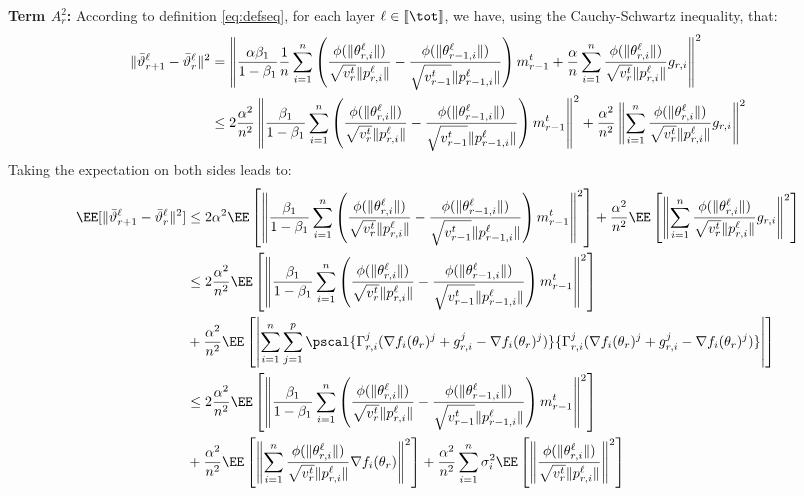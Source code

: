 \documentclass[11pt]{article}
\begin{document}
\textbf{ Term $A_r^2$:}
According to definition \eqref{eq:defseq}, for each layer $\ell \in \llbracket \tot \rrbracket$, we have, using the Cauchy-Schwartz inequality, that:
\begin{align}\notag
  \| \bar{\vartheta}^\ell_{r+1} - \bar{\vartheta}^\ell_r \|^2 & = \left\| \frac{\alpha \beta_1}{1-\beta_1} \frac{1}{n}  \sum_{i = 1}^n  \left( \frac{\phi(\|\theta_{r,i}^{\ell}\|)}{\sqrt{v^{t}_{r}} \|p_{r,i}^{\ell}\|} - \frac{\phi(\|\theta_{r-1,i}^{\ell}\|)}{\sqrt{v^{t}_{r-1}} \|p_{r-1,i}^{\ell}\|} \right) m^{t}_{r-1} + \frac{\alpha}{n} \sum_{i = 1}^n \frac{\phi(\|\theta_{r,i}^{\ell}\|)}{\sqrt{v^{t}_{r}} \|p_{r,i}^{\ell}\|} g_{r,i}\right \|^2 \\\notag
&  \leq 2\frac{\alpha^2}{n^2} \left\| \frac{ \beta_1}{1-\beta_1}   \sum_{i = 1}^n  \left( \frac{\phi(\|\theta_{r,i}^{\ell}\|)}{\sqrt{v^{t}_{r}} \|p_{r,i}^{\ell}\|} - \frac{\phi(\|\theta_{r-1,i}^{\ell}\|)}{\sqrt{v^{t}_{r-1}} \|p_{r-1,i}^{\ell}\|} \right) m^{t}_{r-1}\right\|^2 + \frac{\alpha^2}{n^2} \left\| \sum_{i = 1}^n \frac{\phi(\|\theta_{r,i}^{\ell}\|)}{\sqrt{v^{t}_{r}} \|p_{r,i}^{\ell}\|} g_{r,i}\right\|^2
\end{align}
Taking the expectation on both sides leads to:
\begin{align}\label{eq:maina2}
\begin{split}
\EE[  \| \bar{\vartheta}^\ell_{r+1} - \bar{\vartheta}^\ell_r \|^2] &  \leq 2\alpha^2 \EE \left[ \left\| \frac{ \beta_1}{1-\beta_1}  \sum_{i = 1}^n  \left( \frac{\phi(\|\theta_{r,i}^{\ell}\|)}{\sqrt{v^{t}_{r}} \|p_{r,i}^{\ell}\|} - \frac{\phi(\|\theta_{r-1,i}^{\ell}\|)}{\sqrt{v^{t}_{r-1}} \|p_{r-1,i}^{\ell}\|} \right) m^{t}_{r-1}\right\|^2 \right] +  \frac{\alpha^2}{n^2} \EE\left[ \left\| \sum_{i = 1}^n \frac{\phi(\|\theta_{r,i}^{\ell}\|)}{\sqrt{v^{t}_{r}} \|p_{r,i}^{\ell}\|} g_{r,i}\right\|^2 \right]\\
& \leq 2 \frac{\alpha^2}{n^2} \EE \left[ \left\| \frac{ \beta_1}{1-\beta_1}  \sum_{i = 1}^n  \left( \frac{\phi(\|\theta_{r,i}^{\ell}\|)}{\sqrt{v^{t}_{r}} \|p_{r,i}^{\ell}\|} - \frac{\phi(\|\theta_{r-1,i}^{\ell}\|)}{\sqrt{v^{t}_{r-1}} \|p_{r-1,i}^{\ell}\|} \right) m^{t}_{r-1}\right\|^2 \right] \\
& +  \frac{\alpha^2}{n^2} \EE\left[ \left| \sum_{i = 1}^n\sum_{j = 1}^p    \pscal{\Gamma_{r,i}^j (\nabla f_i(\theta_r)^j + g_{r,i}^j - \nabla f_i(\theta_r)^j) }{\Gamma_{r,i}^j (\nabla f_i(\theta_r)^j + g_{r,i}^j - \nabla f_i(\theta_r)^j)}\right| \right]\\
& \leq 2\frac{\alpha^2}{n^2} \EE \left[ \left\| \frac{ \beta_1}{1-\beta_1}  \sum_{i = 1}^n  \left( \frac{\phi(\|\theta_{r,i}^{\ell}\|)}{\sqrt{v^{t}_{r}} \|p_{r,i}^{\ell}\|} - \frac{\phi(\|\theta_{r-1,i}^{\ell}\|)}{\sqrt{v^{t}_{r-1}} \|p_{r-1,i}^{\ell}\|} \right) m^{t}_{r-1}\right\|^2 \right] \\
& +  \frac{\alpha^2}{n^2} \EE\left[ \left\| \sum_{i = 1}^n \frac{\phi(\|\theta_{r,i}^{\ell}\|)}{\sqrt{v^{t}_{r}} \|p_{r,i}^{\ell}\|}\nabla f_i(\theta_r) \right\|^2 \right] +  \frac{\alpha^2}{n^2} \sum_{i = 1}^n  \sigma_i^2 \EE\left[ \left\|\frac{\phi(\|\theta_{r,i}^{\ell}\|)}{\sqrt{v^{t}_{r}} \|p_{r,i}^{\ell}\|} \right\|^2 \right]
\end{split}
\end{align}
\end{document}

